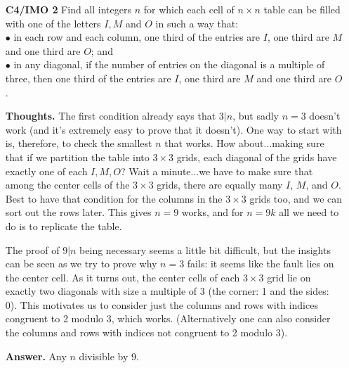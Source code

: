 \documentclass[11pt,a4paper]{article}
\begin{document}
\begin{itemize}
\newpage
\item[\textbf{C4/IMO 2}]
Find all integers $n$ for which each cell of $n \times n$ table can be filled with one of the letters $I,M$ and $O$ in such a way that:\\
$\bullet$ in each row and each column, one third of the entries are $I$, one third are $M$ and one third are $O$; and \\
$\bullet$ in any diagonal, if the number of entries on the diagonal is a multiple of three, then one third of the entries are $I$, one third are $M$ and one third are $O$. 

\textbf{Thoughts.} 
The first condition already says that $3|n$, but sadly $n=3$ doesn't work (and it's extremely easy to prove that it doesn't). 
One way to start with is, therefore, to check the smallest $n$ that works. 
How about...making sure that if we partition the table into $3\times 3$ grids, each diagonal of the grids have exactly one of each $I, M, O$? 
Wait a minute...we have to make sure that among the center cells of the $3\times 3$ grids, there are equally many $I$, $M$, and $O$. 
Best to have that condition for the columns in the $3\times 3$ grids too, and we can sort out the rows later. 
This gives $n=9$ works, and for $n=9k$ all we need to do is to replicate the table. 

The proof of $9|n$ being necessary seems a little bit difficult, but the insights can be seen as we try to prove why $n=3$ fails: 
it seems like the fault lies on the center cell. 
As it turns out, the center cells of each $3\times 3$ grid lie on exactly two diagonals with size a multiple of 3 
(the corner: 1 and the sides: 0). 
This motivates us to consider just the columns and rows with indices congruent to 2 modulo 3, which works. 
(Alternatively one can also consider the columns and rows with indices not congruent to 2 modulo 3). 

\textbf{Answer.} Any $n$ divisible by 9. 


\end{itemize}
\end{document}
